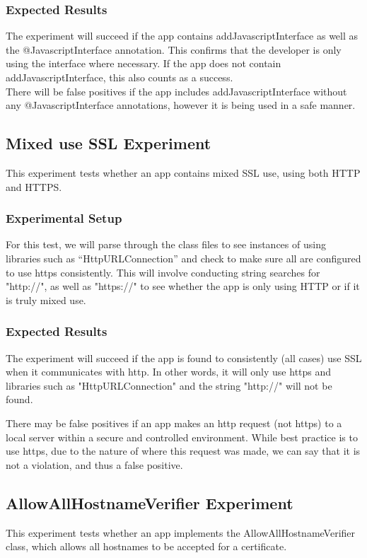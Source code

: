 \documentclass[10pt,twocolumn,pdftex]{article}
\begin{document}
    \subsubsection{Expected Results}
        The experiment will succeed if the app contains addJavascriptInterface as well as the @JavascriptInterface annotation. This confirms that the developer is only using the interface where necessary. If the app does not contain addJavascriptInterface, this also counts as a success. \\
        There will be false positives if the app includes addJavascriptInterface without any @JavascriptInterface annotations, however it is being used in a safe manner.


\subsection{Mixed use SSL Experiment}
    This experiment tests whether an app contains mixed SSL use, using both HTTP and HTTPS. 
    
    \subsubsection{Experimental Setup}
    For this test, we will parse through the class files to see instances of using libraries such as “HttpURLConnection” and check to make sure all are configured to use https consistently. This will involve conducting string searches for "http://", as well as "https://" to see whether the app is only using HTTP or if it is truly mixed use. 
    
    \subsubsection{Expected Results}
    The experiment will succeed if the app is found to consistently (all cases) use SSL when it communicates with http. In other words, it will only use https and libraries such as "HttpURLConnection" and the string "http://" will not be found. 
    
    There may be false positives if an app makes an http request (not https) to a local server within a secure and controlled environment. While best practice is to use https, due to the nature of where this request was made, we can say that it is not a violation, and thus a false positive.
    
    
\subsection{AllowAllHostnameVerifier Experiment}
    This experiment tests whether an app implements the AllowAllHostnameVerifier class, which allows all hostnames to be accepted for a certificate.
    
\end{document}
